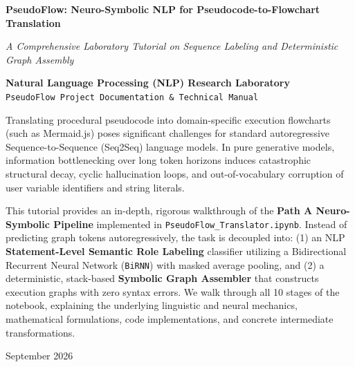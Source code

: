 \documentclass[11pt,a4paper]{article}
\begin{document}
\begin{titlepage}
    \centering
    \vspace*{1.5cm}
    
    {\Huge\bfseries PseudoFlow: Neuro-Symbolic NLP for Pseudocode-to-Flowchart Translation\par}
    \vspace{0.5cm}
    {\Large\itshape A Comprehensive Laboratory Tutorial on Sequence Labeling and Deterministic Graph Assembly\par}
    \vspace{1.2cm}

    \textbf{Natural Language Processing (NLP) Research Laboratory}\\
    \texttt{PseudoFlow Project Documentation \& Technical Manual}
    \vfill

    \begin{tcolorbox}[colback=white,colframe=accentteal,title=Abstract,arc=4pt]
    Translating procedural pseudocode into domain-specific execution flowcharts (such as Mermaid.js) poses significant challenges for standard autoregressive Sequence-to-Sequence (Seq2Seq) language models. In pure generative models, information bottlenecking over long token horizons induces catastrophic structural decay, cyclic hallucination loops, and out-of-vocabulary corruption of user variable identifiers and string literals. 
    
    This tutorial provides an in-depth, rigorous walkthrough of the \textbf{Path A Neuro-Symbolic Pipeline} implemented in \texttt{PseudoFlow\_Translator.ipynb}. Instead of predicting graph tokens autoregressively, the task is decoupled into: (1) an NLP \textbf{Statement-Level Semantic Role Labeling} classifier utilizing a Bidirectional Recurrent Neural Network (\texttt{BiRNN}) with masked average pooling, and (2) a deterministic, stack-based \textbf{Symbolic Graph Assembler} that constructs execution graphs with zero syntax errors. We walk through all 10 stages of the notebook, explaining the underlying linguistic and neural mechanics, mathematical formulations, code implementations, and concrete intermediate transformations.
    \end{tcolorbox}

    \vfill
    {\large September 2026\par}
\end{titlepage}
\end{document}
